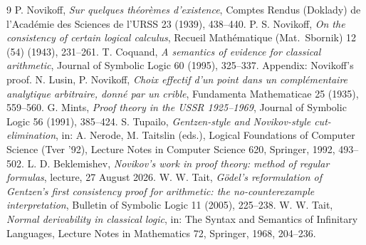 \documentclass[11pt]{amsart}
\theoremstyle{definition}
\theoremstyle{remark}
\begin{document}
\begin{thebibliography}{9}
 P. Novikoff, \emph{Sur quelques th\'eor\`emes
  d'existence}, Comptes Rendus (Doklady) de l'Acad\'emie des Sciences de
  l'URSS 23 (1939), 438--440.
 P. S. Novikoff, \emph{On the consistency of certain
  logical calculus}, Recueil Math\'ematique (Mat.\ Sbornik) 12 (54)
  (1943), 231--261.
 T. Coquand, \emph{A semantics of evidence for classical
  arithmetic}, Journal of Symbolic Logic 60 (1995), 325--337. Appendix:
  Novikoff's proof.
 N. Lusin, P. Novikoff, \emph{Choix effectif d'un point
  dans un compl\'ementaire analytique arbitraire, donn\'e par un crible},
  Fundamenta Mathematicae 25 (1935), 559--560.
 G. Mints, \emph{Proof theory in the USSR 1925--1969},
  Journal of Symbolic Logic 56 (1991), 385--424.
 S. Tupailo, \emph{Gentzen-style and Novikov-style
  cut-elimination}, in: A. Nerode, M. Taitslin (eds.), Logical Foundations
  of Computer Science (Tver '92), Lecture Notes in Computer Science 620,
  Springer, 1992, 493--502.
 L. D. Beklemishev, \emph{Novikov's work in proof
  theory: method of regular formulas}, lecture, 27 August 2026.
 W. W. Tait, \emph{G\"odel's reformulation of Gentzen's first
  consistency proof for arithmetic: the no-counterexample interpretation},
  Bulletin of Symbolic Logic 11 (2005), 225--238.
 W. W. Tait, \emph{Normal derivability in classical logic},
  in: The Syntax and Semantics of Infinitary Languages, Lecture Notes in
  Mathematics 72, Springer, 1968, 204--236.
\end{thebibliography}
\end{document}
